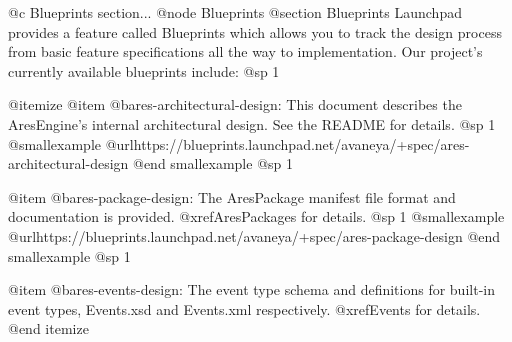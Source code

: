 @c Blueprints section...
@node Blueprints
@section Blueprints
Launchpad provides a feature called Blueprints which allows you to track the design process from basic feature specifications all the way to implementation. Our project's currently available blueprints include:
@sp 1

@itemize
@item
@b{ares-architectural-design}: This document describes the AresEngine's internal architectural design. See the README for details.
@sp 1
@smallexample
@url{https://blueprints.launchpad.net/avaneya/+spec/ares-architectural-design}
@end smallexample
@sp 1

@item
@b{ares-package-design}: The AresPackage manifest file format and documentation is provided. @xref{AresPackages} for details.
@sp 1
@smallexample
@url{https://blueprints.launchpad.net/avaneya/+spec/ares-package-design}
@end smallexample
@sp 1

@item
@b{ares-events-design}: The event type schema and definitions for built-in event types, Events.xsd and Events.xml respectively. @xref{Events} for details.
@end itemize

